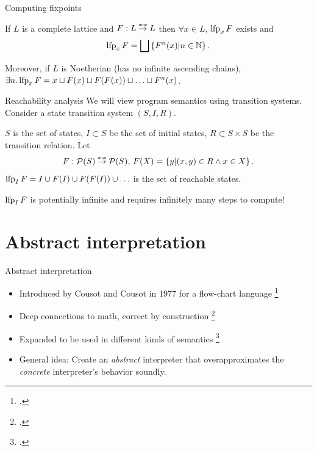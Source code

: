 \documentclass[aspectratio=169,14pt]{beamer}
\begin{document}
\begin{frame}{Computing fixpoints}
  \begin{thm}
    If $L$ is a complete lattice and $F: L \monarrow L$ then $\forall x \in L$, $\operatorname{lfp}_x F$ exists and
    \[
      \operatorname{lfp}_x F = \bigsqcup \left\{F^n(x) \vert n \in \mathbb{N}\right\}.
    \]
  \end{thm}

  Moreover, if $L$ is Noetherian (has no infinite ascending chains), $\exists n. \operatorname{lfp}_x F = x \sqcup F(x) \sqcup F(F(x)) \sqcup \ldots \sqcup F^n(x)$.
\end{frame}

\begin{frame}{Reachability analysis}
  We will view program semantics using transition systems. Consider a state transition system $(S, I, R)$.\pause
  
  $S$ is the set of states, \pause $I \subset S$ be the set of initial states, \pause $R \subset S \times S$ be the transition relation. \pause Let
  \[ F : \pw(S) \monarrow \pw(S),\, F(X) = \Set{y \vert (x, y) \in R \wedge x \in X}. \]\pause
  $\operatorname{lfp}_I F = I \cup F(I) \cup F(F(I)) \cup \ldots $ is the set of reachable states.\pause

  \alert{$\operatorname{lfp}_I F$ is potentially infinite and requires infinitely many steps to compute!}
\end{frame}

\section{Abstract interpretation}
\begin{frame}{Abstract interpretation}
  \begin{itemize}[<+->]
  \item Introduced by Cousot and Cousot in 1977 for a flow-chart language \footcite{cousot1977abstract}
  \item Deep connections to math, correct by construction \footcite{cousot1979systematic}
  \item Expanded to be used in different kinds of semantics \footcite{schmidt1998trace,schmidt2009abstract}
  \item General idea: Create an \emph{abstract} interpreter that
    overapproximates the \emph{concrete} interpreter's behavior
    soundly.
  \end{itemize}
\end{frame}
\end{document}
